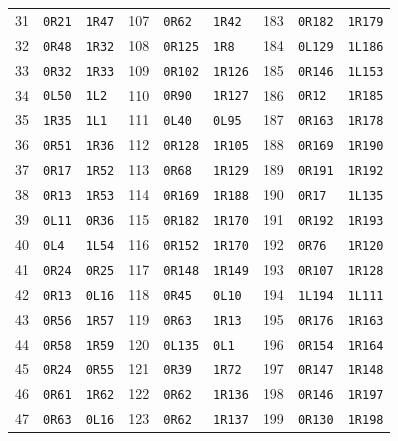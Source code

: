 {\begin{longtable}{@{}rll@{\hspace{8mm}}rll@{\hspace{8mm}}rll@{}}
31 & \texttt{0R21} & \texttt{1R47} & 107 & \texttt{0R62} & \texttt{1R42} & 183 & \texttt{0R182} & \texttt{1R179} \\
32 & \texttt{0R48} & \texttt{1R32} & 108 & \texttt{0R125} & \texttt{1R8} & 184 & \texttt{0L129} & \texttt{1L186} \\
33 & \texttt{0R32} & \texttt{1R33} & 109 & \texttt{0R102} & \texttt{1R126} & 185 & \texttt{0R146} & \texttt{1L153} \\
34 & \texttt{0L50} & \texttt{1L2} & 110 & \texttt{0R90} & \texttt{1R127} & 186 & \texttt{0R12} & \texttt{1R185} \\
35 & \texttt{1R35} & \texttt{1L1} & 111 & \texttt{0L40} & \texttt{0L95} & 187 & \texttt{0R163} & \texttt{1R178} \\
36 & \texttt{0R51} & \texttt{1R36} & 112 & \texttt{0R128} & \texttt{1R105} & 188 & \texttt{0R169} & \texttt{1R190} \\
37 & \texttt{0R17} & \texttt{1R52} & 113 & \texttt{0R68} & \texttt{1R129} & 189 & \texttt{0R191} & \texttt{1R192} \\
38 & \texttt{0R13} & \texttt{1R53} & 114 & \texttt{0R169} & \texttt{1R188} & 190 & \texttt{0R17} & \texttt{1L135} \\
39 & \texttt{0L11} & \texttt{0R36} & 115 & \texttt{0R182} & \texttt{1R170} & 191 & \texttt{0R192} & \texttt{1R193} \\
40 & \texttt{0L4} & \texttt{1L54} & 116 & \texttt{0R152} & \texttt{1R170} & 192 & \texttt{0R76} & \texttt{1R120} \\
41 & \texttt{0R24} & \texttt{0R25} & 117 & \texttt{0R148} & \texttt{1R149} & 193 & \texttt{0R107} & \texttt{1R128} \\
42 & \texttt{0R13} & \texttt{0L16} & 118 & \texttt{0R45} & \texttt{0L10} & 194 & \texttt{1L194} & \texttt{1L111} \\
43 & \texttt{0R56} & \texttt{1R57} & 119 & \texttt{0R63} & \texttt{1R13} & 195 & \texttt{0R176} & \texttt{1R163} \\
44 & \texttt{0R58} & \texttt{1R59} & 120 & \texttt{0L135} & \texttt{0L1} & 196 & \texttt{0R154} & \texttt{1R164} \\
45 & \texttt{0R24} & \texttt{0R55} & 121 & \texttt{0R39} & \texttt{1R72} & 197 & \texttt{0R147} & \texttt{1R148} \\
46 & \texttt{0R61} & \texttt{1R62} & 122 & \texttt{0R62} & \texttt{1R136} & 198 & \texttt{0R146} & \texttt{1R197} \\
47 & \texttt{0R63} & \texttt{0L16} & 123 & \texttt{0R62} & \texttt{1R137} & 199 & \texttt{0R130} & \texttt{1R198} \\

\end{longtable}}
